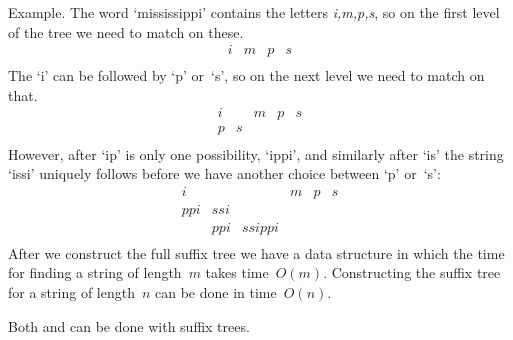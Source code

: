 Example. The word `mississippi' contains the letters \emph{i,m,p,s},
so on the first level of the tree we need to match on these.
\[ 
\begin{array}{*{12}{c}}
i&m&p&s\\
\end{array}
\]
The `i' can be followed by `p' or~`s', so on the next level
we need to match on that.
\[ 
\begin{array}{*{12}{c}}
i& &m&p&s\\
p&s\\
\end{array}
\]
However, after `ip' is only one possibility, `ippi', 
and similarly after `is' the string `issi' uniquely
follows before we have another choice between `p' or~`s':
\[ 
\begin{array}{*{12}{c}}
i  &   &      &m&p&s\\
ppi&ssi\\
   &ppi&ssippi\\
\end{array}
\]
After we construct the full suffix tree we have a data structure
in which the time for finding a string of length~$m$ takes
time~$O(m)$.
Constructing the suffix tree for a string of length~$n$ 
can be done in time~$O(n)$.

Both 
 and  can
be done with suffix trees.

